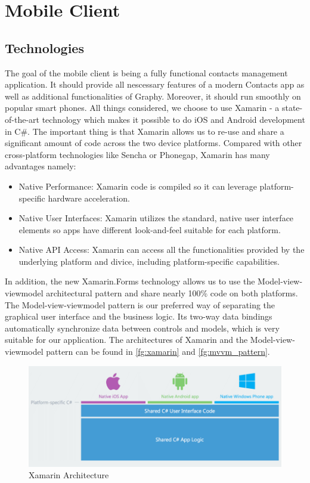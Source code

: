\section{Mobile Client}
\subsection{Technologies}
The goal of the mobile client is being a fully functional contacts management application. It should provide all nescessary features of a modern Contacts app as well as additional functionalities of Graphy. Moreover, it should run smoothly on popular smart phones. All things considered, we choose to use Xamarin - a state-of-the-art technology which makes it possible to do iOS and Android development in C\#. The important thing is that Xamarin allows us to re-use and share a significant amount of code across the two device platforms. Compared with other cross-platform technologies like Sencha or Phonegap, Xamarin has many advantages namely:

\begin{itemize}
\item Native Performance: Xamarin code is compiled so it can leverage platform-specific hardware acceleration.
\item Native User Interfaces: Xamarin utilizes the standard, native user interface elements so apps have different look-and-feel suitable for each platform.
\item Native API Access: Xamarin can access all the functionalities provided by the underlying platform and divice, including platform-specific capabilities.
\end{itemize}

In addition, the new Xamarin.Forms technology allows us to use the Model-view-viewmodel architectural pattern and share nearly 100\% code on both platforms. The Model-view-viewmodel pattern is our preferred way of separating the graphical user interface and the business logic. Its two-way data bindings automatically synchronize data between controls and models, which is very suitable for our application. The architectures of Xamarin and the Model-view-viewmodel pattern can be found in \autoref{fg:xamarin} and \autoref{fg:mvvm_pattern}.

\begin{figure}[!h]
\begin{centering}
\includegraphics[scale=0.55]{pics/xamarin.png}
\caption{Xamarin Architecture}\label{fg:xamarin}
\end{centering}
\end{figure}

